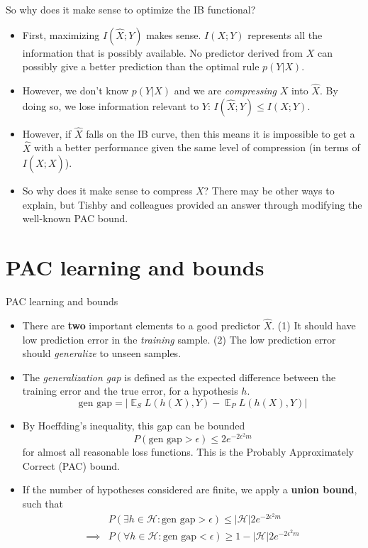 \documentclass{beamer}
\DeclareMathOperator{\E}{\mathbb{E}}
\begin{document}
\begin{frame}{So why does it make sense to optimize the IB functional?}
\begin{itemize}
	\item First, maximizing $I(\hat{X};Y)$ makes sense. $I(X;Y)$ represents all the information that is possibly available. No predictor derived from $X$ can possibly give a better prediction than the optimal rule $p(Y|X)$. 
	\item However, we don't know $p(Y|X)$ and we are \emph{compressing} $X$ into $\hat{X}$. By doing so, we lose information relevant to $Y$: $I(\hat{X};Y) \leq I(X;Y)$. 
	\item However, if $\hat{X}$ falls on the IB curve, then this means it is impossible to get a $\hat{X}$ with a better performance given the same level of compression (in terms of $I(\hat{X};X)$). 
	\item So why does it make sense to compress $X$? There may be other ways to explain, but Tishby and colleagues provided an answer through modifying the well-known PAC bound. 
\end{itemize}
\end{frame}

\section{PAC learning and bounds}
\begin{frame}{PAC learning and bounds}
\begin{itemize}
	\item There are \textbf{two} important elements to a good predictor $\hat{X}$. (1) It should have low prediction error in the \emph{training} sample. (2) The low prediction error should \emph{generalize} to unseen samples. 
	\item The \emph{generalization gap} is defined as the expected difference between the training error and the true error, for a hypothesis $h$. 
	\[
	\text{gen gap} = | \E_S L(h(X), Y) - \E_P L(h(X), Y) | 
	\]
	\item By Hoeffding's inequality, this gap can be bounded
	\[
		P(\text{gen gap} > \epsilon) \leq 2e^{-2\epsilon^2m} 
	\]
	for almost all reasonable loss functions. This is the Probably Approximately Correct (PAC) bound. 
	\item If the number of hypotheses considered are finite, we apply a \textbf{union bound}, such that
	\begin{align*}
		&P(\exists h \in \mathcal{H}: \text{gen gap} > \epsilon) \leq |\mathcal{H}| 2e^{-2\epsilon^2m} \\ 
		\implies & P(\forall h \in \mathcal{H}: \text{gen gap} < \epsilon) \geq 1- |\mathcal{H}|2e^{-2\epsilon^2m}
	\end{align*}
\end{itemize}
\end{frame}
\end{document}
